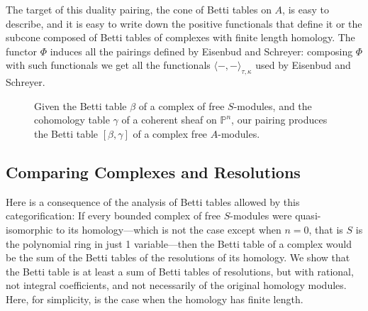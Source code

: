 \documentclass[12pt]{amsart}
\theoremstyle{definition}
\theoremstyle{remark}
\newcommand{\PP}{\mathbb{P}}
\newcommand{\CQ}{\mathrm{C}}
\newcommand{\BBQ}{\underline{\mathrm{B}}}
\begin{document}
The target of this duality pairing, the cone of Betti tables on $A$, is easy to describe, and it is easy to write down the positive functionals that define it or the subcone composed of Betti tables of complexes with finite length homology. 
The functor $\Phi$ induces all the pairings defined by Eisenbud and Schreyer: composing $\Phi$ with such functionals we get all the functionals $\langle -,-\rangle_{\tau,\kappa}$ used by Eisenbud and Schreyer.
\begin{figure}
\caption{Given the Betti table $\beta$ of a complex of free $S$-modules, and the cohomology table $\gamma$ of a coherent sheaf on $\PP^n$, our pairing produces the Betti table $[\beta, \gamma]$ of a complex free $A$-modules.
}
\label{fig:bracket}
\end{figure}

\subsection*{Comparing Complexes and Resolutions} Here is a consequence of the analysis of Betti tables allowed by this categorification: If every bounded complex of free $S$-modules were quasi-isomorphic to its homology---which is not the case except when $n=0$, that is $S$ is the polynomial ring in just 1 variable---then the Betti table of a complex would be the sum of the Betti tables of the resolutions of its homology.  We show that the Betti table is at least a sum of Betti tables of resolutions, but with rational, not integral coefficients, and not necessarily of the original homology modules. Here, for simplicity, is the case when the homology has finite length. 
\end{document}
